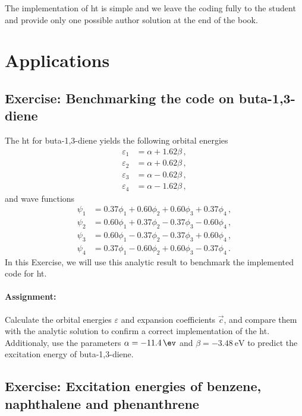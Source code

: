 The implementation of \acrshort{ht} is simple and we leave the coding fully to the student and provide only one possible author solution at the end of the book.

\section{Applications}

\subsection*{Exercise: Benchmarking the code on buta-1,3-diene}

The \acrlong{ht} for buta-1,3-diene yields the following orbital energies 
\begin{equation*}
\begin{split}
\varepsilon_1 &= \alpha+1.62\beta \, ,\\
\varepsilon_2 &= \alpha+0.62\beta \, ,\\
\varepsilon_3 &= \alpha-0.62\beta \, ,\\
\varepsilon_4 &= \alpha-1.62\beta \, ,
\end{split}
\end{equation*}
and wave functions
\begin{equation*}
\begin{split}
\psi_1 &= 0.37\phi_1+0.60\phi_2+0.60\phi_3+0.37\phi_4 \, ,\\
\psi_2 &= 0.60\phi_1+0.37\phi_2-0.37\phi_3-0.60\phi_4 \, ,\\
\psi_3 &= 0.60\phi_1-0.37\phi_2-0.37\phi_3+0.60\phi_4 \, ,\\
\psi_4 &= 0.37\phi_1-0.60\phi_2+0.60\phi_3-0.37\phi_4 \, .
\end{split}
\end{equation*}
In this Exercise, we will use this analytic result to benchmark the implemented code for \acrshort{ht}.

\paragraph{Assignment:} Calculate the orbital energies $\varepsilon$ and expansion coefficients $\Vec{c}$, and compare them with the analytic solution to confirm a correct implementation of the \acrlong{ht}. Additionaly, use the parameters $\alpha = \SI{-11.4}{\ev}$ and $\beta = \SI{-3.48}{\eV}$ to predict the excitation energy of buta-1,3-diene.

\subsection*{Exercise: Excitation energies of benzene, naphthalene and phenanthrene}

